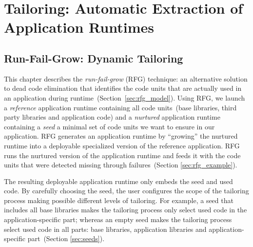 
\part{Tailoring: Automatic Extraction of Application Runtimes}
\chapter{Run-Fail-Grow: Dynamic Tailoring}
\minitoc
\introduction



This chapter describes the \emph{run-fail-grow} (RFG) technique: an alternative solution to dead code elimination that identifies the code units that are actually used in an application during runtime~(Section~\ref{sec:rfg_model}).
Using RFG, we launch a \emph{reference} application runtime containing all code units~(base libraries, third party libraries and application code) and a \emph{nurtured} application runtime containing a \emph{seed} \ie a minimal set of code units we want to ensure in our application.
RFG generates an application runtime by ``growing'' the nurtured runtime into a deployable specialized version of the reference application. 
RFG runs the nurtured version of the application runtime and feeds it with the code units that were detected missing through failures~(Section \ref{sec:rfg_example}).

The resulting deployable application runtime only embeds the seed and used code.
By carefully choosing the seed, the user configures the scope of the tailoring process making possible different levels of tailoring.
For example, a seed that includes all base libraries makes the tailoring process only select used code in the application-specific part; whereas an empty seed makes the tailoring process select used code in all parts: base libraries, application libraries and application-specific part~(Section \ref{sec:seeds}).

